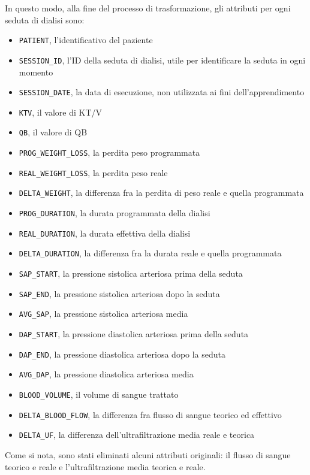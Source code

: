 \documentclass[preprint]{acm_proc_article-sp}
\begin{document}
In questo modo, alla fine del processo di trasformazione, gli attributi per ogni seduta di dialisi sono:

\begin{itemize}
\item \verb|PATIENT|, l'identificativo del paziente
\item \verb|SESSION_ID|, l'ID della seduta di dialisi, utile per identificare la seduta in ogni momento
\item \verb|SESSION_DATE|, la data di esecuzione, non utilizzata ai fini dell'apprendimento
\item \verb|KTV|, il valore di KT/V
\item \verb|QB|, il valore di QB
\item \verb|PROG_WEIGHT_LOSS|, la perdita peso programmata
\item \verb|REAL_WEIGHT_LOSS|, la perdita peso reale
\item \verb|DELTA_WEIGHT|, la differenza fra la perdita di peso reale e quella programmata
\item \verb|PROG_DURATION|, la durata programmata della dialisi
\item \verb|REAL_DURATION|, la durata effettiva della dialisi
\item \verb|DELTA_DURATION|, la differenza fra la durata reale e quella programmata
\item \verb|SAP_START|, la pressione sistolica arteriosa prima della seduta
\item \verb|SAP_END|, la pressione sistolica arteriosa dopo la seduta
\item \verb|AVG_SAP|, la pressione sistolica arteriosa media
\item \verb|DAP_START|, la pressione diastolica arteriosa prima della seduta
\item \verb|DAP_END|, la pressione diastolica arteriosa dopo la seduta
\item \verb|AVG_DAP|, la pressione diastolica arteriosa media
\item \verb|BLOOD_VOLUME|, il volume di sangue trattato
\item \verb|DELTA_BLOOD_FLOW|, la differenza fra flusso di sangue teorico ed effettivo
\item \verb|DELTA_UF|, la differenza dell'ultrafiltrazione media reale e teorica
\end{itemize}

Come si nota, sono stati eliminati alcuni attributi originali: il flusso di sangue teorico e reale e l'ultrafiltrazione media teorica e reale.
\end{document}
